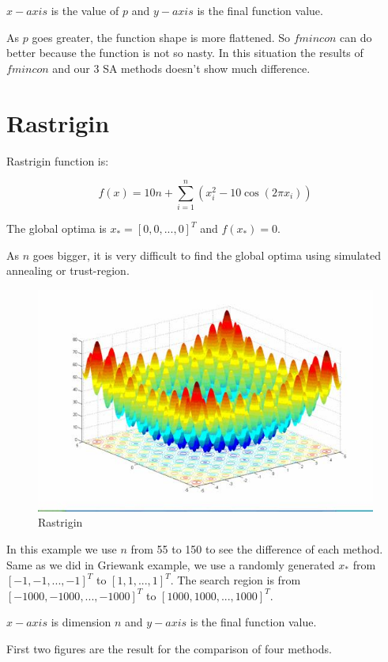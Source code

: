 \documentclass[letterpaper,12pt,titlepage,oneside,final]{book}
\begin{document}
$x-axis$ is the value of $p$ and $y-axis$ is the final function value.

As $p$ goes greater, the function shape is more flattened. So $fmincon$ can do better because the function is not so nasty. In this situation the results of $fmincon$ and our 3 SA methods doesn't show much difference.

\section{Rastrigin}

Rastrigin function is:

\begin{equation}
f(x)=10n+\sum_{i=1}^n(x_i^2-10\cos (2\pi x_i))
\end{equation}

The global optima is $x_*=[0,0,...,0]^T$ and $f(x_*)=0$.

As $n$ goes bigger, it is very difficult to find the global optima using simulated annealing or trust-region.

\begin{figure}[H]
\includegraphics[scale=1.1]{Rastrigin}
\caption{Rastrigin}
\end{figure}

In this example we use $n$ from 55 to 150 to see the difference of each method. Same as we did in Griewank example, we use a randomly generated $x_*$ from $[-1,-1,...,-1]^T$ to $[1,1,...,1]^T$. The search region is from $[-1000,-1000,...,-1000]^T$ to $[1000,1000,...,1000]^T$. 

$x-axis$ is dimension $n$ and $y-axis$ is the final function value.

First two figures are the result for the comparison of four methods.
\end{document}
